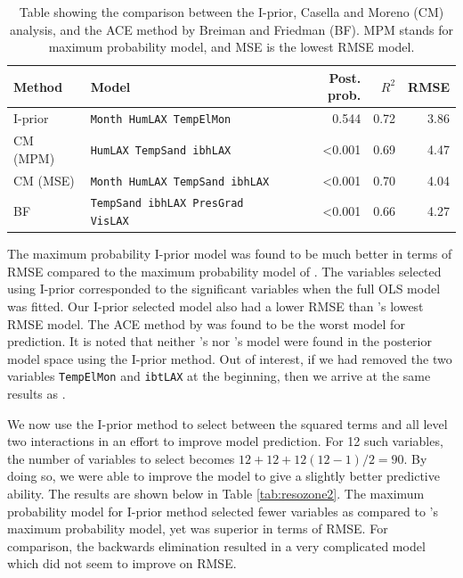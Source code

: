 \begin{table}[h]
\centering\small
\begin{tabular}{l|lrrr}
Method      & Model                           & Post. prob.     & $R^2$		& RMSE  \\
\hline
I-prior     & \texttt{Month HumLAX TempElMon}          & 0.544           & 0.72     & 3.86 \\
CM (MPM)  & \texttt{HumLAX TempSand ibhLAX}          & \textless 0.001 & 0.69     & 4.47 \\
CM (MSE)  & \texttt{Month HumLAX TempSand ibhLAX}    & \textless 0.001 & 0.70     & 4.04 \\
BF & \texttt{TempSand ibhLAX PresGrad VisLAX} & \textless 0.001 & 0.66     & 4.27
\end{tabular}
\caption{Table showing the comparison between the I-prior, Casella and Moreno (CM) analysis, and the ACE method by Breiman and Friedman (BF). MPM stands for maximum probability model, and MSE is the lowest RMSE model.}
\label{tab:ozoneres}
\end{table}

The maximum probability I-prior model was found to be much better in terms of RMSE compared to the maximum probability model of \citeauthor{Casella2006}. The variables selected using I-prior corresponded to the significant variables when the full OLS model was fitted. Our I-prior selected model also had a lower RMSE than \citeauthor{Casella2006}'s lowest RMSE model. The ACE method by \citeauthor{Breiman1985} was found to be the worst model for prediction. It is noted that neither \citeauthor{Casella2006}'s nor \citeauthor{Breiman1985}'s model were found in the posterior model space using the I-prior method. Out of interest, if we had removed the two variables \texttt{TempElMon} and \texttt{ibtLAX} at the beginning, then we arrive at the same results as \citeauthor{Casella2006}.

We now use the I-prior method to select between the squared terms and all level two interactions in an effort to improve model prediction. For 12 such variables, the number of variables to select becomes $12 + 12 + 12(12 - 1)/2 = 90$. By doing so, we were able to improve the model to give a slightly better predictive ability. The results are shown below in Table \ref{tab:resozone2}. The maximum probability model for I-prior method selected fewer variables as compared to \citeauthor{Casella2006}'s maximum probability model, yet was superior in terms of RMSE. For comparison, the backwards elimination resulted in a very complicated model which did not seem to improve on RMSE.

